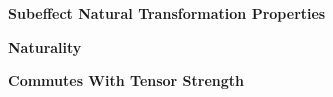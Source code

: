     \begin{figure}
        \begin{framed}
            \centering\textbf{Subeffect Natural Transformation Properties}
    
            \begin{framed}
                \centering
                \textbf{Naturality}
                
            \end{framed}
    
            \begin{framed}
                \centering
                \textbf{Commutes With Tensor Strength}
    
    
    
    
        

\end{framed}
\end{framed}
\end{figure}
